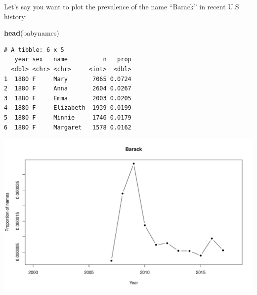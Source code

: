 \documentclass[
]{book}
\newenvironment{Shaded}{\begin{snugshade}}{\end{snugshade}}
\newcommand{\DataTypeTok}[1]{\textcolor[rgb]{0.13,0.29,0.53}{#1}}
\newcommand{\DecValTok}[1]{\textcolor[rgb]{0.00,0.00,0.81}{#1}}
\newcommand{\KeywordTok}[1]{\textcolor[rgb]{0.13,0.29,0.53}{\textbf{#1}}}
\newcommand{\NormalTok}[1]{#1}
\newcommand{\OperatorTok}[1]{\textcolor[rgb]{0.81,0.36,0.00}{\textbf{#1}}}
\newcommand{\StringTok}[1]{\textcolor[rgb]{0.31,0.60,0.02}{#1}}
\begin{document}
Let's say you want to plot the prevalence of the name ``Barack'' in recent U.S history:

\begin{Shaded}
\begin{Highlighting}[]
\KeywordTok{head}\NormalTok{(babynames)}
\end{Highlighting}
\end{Shaded}

\begin{verbatim}
# A tibble: 6 x 5
   year sex   name          n   prop
  <dbl> <chr> <chr>     <int>  <dbl>
1  1880 F     Mary       7065 0.0724
2  1880 F     Anna       2604 0.0267
3  1880 F     Emma       2003 0.0205
4  1880 F     Elizabeth  1939 0.0199
5  1880 F     Minnie     1746 0.0179
6  1880 F     Margaret   1578 0.0162
\end{verbatim}

\begin{Shaded}
\end{Shaded}

\includegraphics{figures/unnamed-chunk-174-1.pdf}
\end{document}
